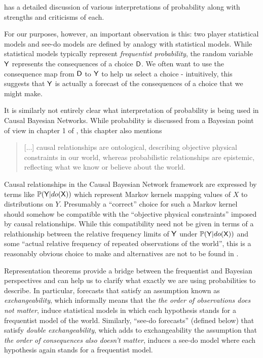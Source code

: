 \citet{hajek_interpretations_2019} has a detailed discussion of various interpretations of probability along with strengths and criticisms of each.

For our purposes, however, an important observation is this: two player statistical models and see-do models are defined by analogy with statistical models. While statistical models typically represent \emph{frequentist probability}, the random variable $\mathsf{Y}$ represents the consequences of a choice $\mathsf{D}$. We often want to use the consequence map from $\mathsf{D}$ to $\mathsf{Y}$ to help us select a choice - intuitively, this suggests that $\mathsf{Y}$ is actually a forecast of the consequences of a choice that we might make.

It is similarly not entirely clear what interpretation of probability is being used in Causal Bayesian Networks. While probability is discussed from a Bayesian point of view in chapter 1 of \citet{pearl_causality:_2009}, this chapter also mentions

\begin{quote}
[...] causal relationships are ontological, describing objective physical constraints in our world, whereas probabilistic relationships are epistemic, reflecting what we know or believe about the world.
\end{quote}

Causal relationships in the Causal Bayesian Network framework are expressed by terms like $\mathbb{P}(\mathsf{Y}|do(\mathsf{X}))$ which represent Markov kernels mapping values of $X$ to distributions on $Y$. Presumably a ``correct'' choice for such a Markov kernel should somehow be compatible with the ``objective physical constraints'' imposed by causal relationships. While this compatibility need not be given in terms of a relathionship between the relative frequency limits of $\mathsf{Y}$ under $\mathbb{P}(\mathsf{Y}|do(\mathsf{X}))$ and some ``actual relative frequency of repeated observations of the world'', this is a reasonably obvious choice to make and alternatives are not to be found in \citet{pearl_causality:_2009}.

Representation theorems provide a bridge between the frequentist and Bayesian perspectives and can help us to clarify what exactly we are using probabilities to describe. In particular, forecasts that satisfy an assumption known as \emph{exchangeability}, which informally means that the \emph{the order of observations does not matter}, induce statistical models in which each hypothesis stands for a frequentist model of the world. Similarly, ``see-do forecasts'' (defined below) that satisfy \emph{double exchangeability}, which adds to exchangeability the assumption that \emph{the order of consequences also doesn't matter}, induces a see-do model where each hypothesis again stands for a frequentist model.

